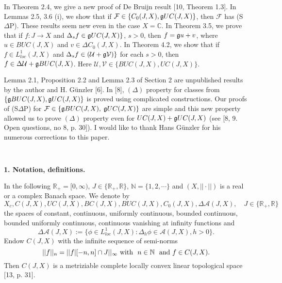 \documentclass[10pt,onside,reqno]{amsart}
\newcommand{\Cdb}{\mbox{$\mathbb{C}$}}
\newcommand{\Ndb}{\mbox{$\mathbb{N}$}}
\newcommand{\Rdb}{\mbox{$\mathbb{R}$}}
\newcommand{\A}{\mbox{${\mathcal A}$}}
\newcommand{\F}{\mbox{${\mathcal F}$}}
\newcommand{\U}{\mbox{${\mathcal U}$}}
\newcommand{\V}{\mbox{${\mathcal V}$}}
\theoremstyle{remark}
\theoremstyle{definition}
\begin{document}
In Theorem 2.4, we give a new proof of  De Bruijn result [10, Theorem 1.3]. In Lemmas 2.5, 3.6 (i), we show that if $\F\in \{C_0 (J,X), \frak{g} UC(J,X)\}$, then $\F$ has (S$\Delta$P). These results seem new even in the case $X=\Cdb$. In Theorem 3.5, we prove that if $f: J\to X$ and $\Delta_s f \in \frak{g} UC(J,X)\}$, $s > 0$, then $f= \frak{g}u+v$, where $u\in BUC(J,X)$ and $v\in \Delta C_0 (J,X)$. In Theorem 4.2, we show that if $f\in L^1_{loc}(J,X)$ and $\Delta_s f \in ( \U +\frak{g} \V)\}$ for each $s > 0$, then $f \in \Delta \U+ \frak{g} BUC (J,X)$. Here $\U, \V\in \{BUC(J,X), UC(J,X)\}$.

 Lemma 2.1, Proposition 2.2 and Lemma 2.3 of  Section 2 are unpublished
   results by the author and H. G\"{u}nzler [6].  In [8],  $(\Delta)$ property for classes  from $\{\frak{g}BUC(J,X), \frak{g} UC(J,X)\}$ is proved  using
  complicated constructions.  Our proofs of (S$\Delta$P) for
   $\F\in \{\frak{g}BUC(J,X),$
$ \frak{g} UC(J,X)\}$ are simple  and this new property allowed us to prove $(\Delta)$ property  even for $ UC(J,X) + \frak{g} UC(J,X)$ (see  [8, 9. Open questions, no 8, p. 30]).  I would like to thank Hans G\"{u}nzler for his numerous  corrections to this paper.

\

\noindent\textbf{1.   Notation, definitions.}

In the following   $\mathbb{R}_+ = [0,\infty)$, $J\in \{\mathbb{R}_+, \mathbb{R}\}$,  $\Ndb=\{1, 2, \cdots\}$ and $(X, ||\cdot||)$ is a real or a complex Banach space.  We denote by
\begin{equation}
\label{metric}
X_c,  C(J,X), UC(J,X) , BC(J,X), BUC(J,X), C_0(J,X),
\Delta
\A (J,X),
\quad  J\in\{\Rdb_+,\Rdb\}
\end{equation}
\noindent  the spaces of constant,  continuous,  uniformly  continuous,  bounded continuous,  bounded uniformly  continuous, continuous vanishing at infinity functions and
\begin{equation}
\label{metric}\Delta  \A (J,X):=\{\phi\in L^1_{loc}(J,X): \Delta_h \phi \in \A (J,X), h >0 \}.\end{equation}
\noindent Endow $C (J,X)$ with the infinite sequence of  semi-norms
\begin{equation}
||f||_n=||f| [-n,n]\cap J||_{\infty} \text{\,\,with \,\,}n\in \Ndb \text{\,\, and\,\,}  f\in C (J,X).
\end{equation}
\noindent Then   $C (J,X)$ is a metriziable
 complete locally convex linear topological  space [13, p. 31].
\end{document}

